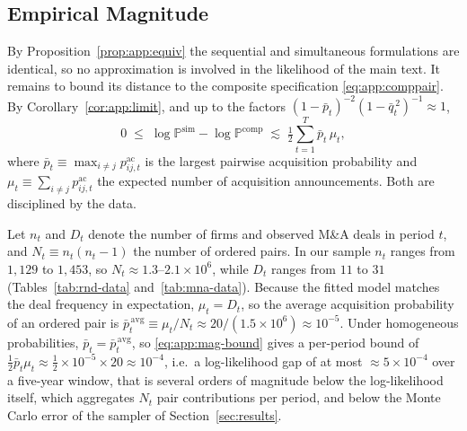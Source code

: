 \subsection{Empirical Magnitude}
\label{app:equivalence:empirics}
By Proposition~\ref{prop:app:equiv} the sequential and simultaneous
formulations are identical, so no approximation is involved in the
likelihood of the main text. It remains to bound its distance to the
composite specification \eqref{eq:app:comppair}. By
Corollary~\ref{cor:app:limit}, and up to the factors
$(1-\bar{p}_t)^{-2}(1-\bar{q}_t^{\,2})^{-1}\approx 1$,
\begin{equation}
  0 \;\le\;
  \log \mathbb{P}^{\mathrm{sim}} - \log \mathbb{P}^{\mathrm{comp}}
  \;\lesssim\;
  \tfrac{1}{2}\sum_{t=1}^{T} \bar{p}_t\,\mu_t,
  \label{eq:app:mag-bound}
\end{equation}
where $\bar{p}_t \equiv \max_{i\neq j} p^{\mathrm{ac}}_{ij,t}$ is the
largest pairwise acquisition probability and
$\mu_t \equiv \sum_{i\neq j} p^{\mathrm{ac}}_{ij,t}$ the expected number
of acquisition announcements. Both are disciplined by the data.

Let $n_t$ and $D_t$ denote the number of firms and observed M\&A deals
in period $t$, and $N_t \equiv n_t(n_t-1)$ the number of ordered pairs.
In our sample $n_t$ ranges from $1{,}129$ to $1{,}453$, so
$N_t \approx 1.3$--$2.1\times10^{6}$, while $D_t$ ranges from $11$ to
$31$ (Tables~\ref{tab:rnd-data} and~\ref{tab:mna-data}). Because the
fitted model matches the deal frequency in expectation, $\mu_t = D_t$,
so the average acquisition probability of an ordered pair is
$\bar{p}^{\,\mathrm{avg}}_t \equiv \mu_t/N_t \approx
20/(1.5\times10^{6}) \approx 10^{-5}$. Under homogeneous probabilities,
$\bar{p}_t = \bar{p}^{\,\mathrm{avg}}_t$, so \eqref{eq:app:mag-bound}
gives a per-period bound of
$\tfrac{1}{2}\bar{p}_t\mu_t \approx \tfrac{1}{2}\times 10^{-5}\times 20
\approx 10^{-4}$, i.e.\ a log-likelihood gap of at most
$\approx 5\times10^{-4}$ over a five-year window, that is several orders of
magnitude below the log-likelihood itself, which aggregates $N_t$ pair
contributions per period, and below the Monte Carlo error of the sampler
of Section~\ref{sec:results}.

